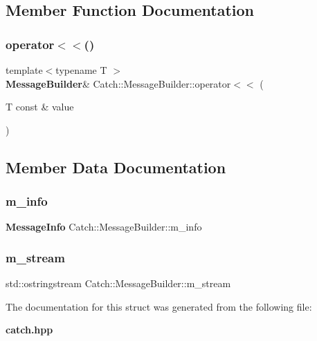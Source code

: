 \subsection{Member Function Documentation}
\mbox{\label{struct_catch_1_1_message_builder_a20fa48d069b20dddcc2d3df8abb123c1}} 
\subsubsection{operator$<$$<$()}
{\footnotesize\ttfamily template$<$typename T $>$ \\
\textbf{ Message\+Builder}\& Catch\+::\+Message\+Builder\+::operator$<$$<$ (\begin{DoxyParamCaption}\item[{T const \&}]{value }\end{DoxyParamCaption})\hspace{0.3cm}{\ttfamily [inline]}}



\subsection{Member Data Documentation}
\mbox{\label{struct_catch_1_1_message_builder_a979f1c2b36d78f80ee275bfa5ba0209f}} 
\subsubsection{m\+\_\+info}
{\footnotesize\ttfamily \textbf{ Message\+Info} Catch\+::\+Message\+Builder\+::m\+\_\+info}

\mbox{\label{struct_catch_1_1_message_builder_a6488ab0cc4ea52affc9c0612c7c5df6b}} 
\subsubsection{m\+\_\+stream}
{\footnotesize\ttfamily std\+::ostringstream Catch\+::\+Message\+Builder\+::m\+\_\+stream}



The documentation for this struct was generated from the following file\+:\begin{DoxyCompactItemize}
\item 
\textbf{ catch.\+hpp}\end{DoxyCompactItemize}
